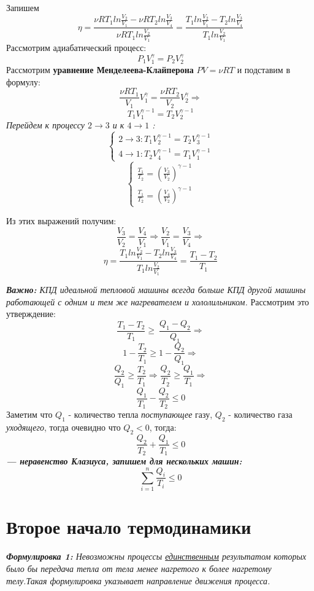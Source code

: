 Запишем
\[ \eta  = \frac{\nu RT_1 ln{\frac{V_2}{V_1}} - \nu RT_2 ln{\frac{V_3}{V_4}}}{\nu RT_1 ln{\frac{V_2}{V_1}}} =  \frac{T_1ln{\frac{V_2}{V_1}} - T_2ln{\frac{V_3}{V_4}}}{T_1ln{\frac{V_2}{V_1}}}\]
Рассмотрим адиабатический процесс:
\[ P_1V_1^{\gamma} = P_2V_2^{\gamma}\]
Рассмотрим \textbf{уравнение Менделеева-Клайперона }$ PV = \nu RT$ и подставим в формулу:
\[ \frac{\nu RT_1}{V_1}V_1^{\gamma} = \frac{\nu RT_2}{V_2}V_2^{\gamma} \Rightarrow \]
\[ T_1V_1^{\gamma - 1} = T_2V_2^{\gamma - 1}\]
\textit{Перейдем к процессу $2 \to 3$  и к $ 4 \to 1$ :}
\begin{equation*}
    \begin{cases}
        2 \to 3: T_1V_2^{\gamma - 1} = T_2V_3^{\gamma - 1}
        \\
        4 \to 1: T_2V_4^{\gamma - 1} = T_1V_1^{\gamma - 1}
    \end{cases}
\end{equation*}
\begin{equation*}
    \begin{cases}
        \frac{T_1}{T_2} = (\frac{V_3}{V_2}) ^ {\gamma - 1}
        \\
        \frac{T_1}{T_2} = (\frac{V_4}{V_2}) ^ {\gamma - 1}
    \end{cases}
\end{equation*}

Из этих выражений получим:
\[ \frac{V_3}{V_2} = \frac{V_4}{V_1} \Rightarrow \frac{V_2}{V_1} = \frac{V_3}{V_4} \Rightarrow\]
\[ \eta = \frac{T_1ln{\frac{V_2}{V_1}} - T_2ln{\frac{V_3}{V_4}}}{T_1ln{\frac{V_2}{V_1}}} = \frac{T_1 - T_2}{T_1}\]

\textit{\textbf{Важно: }КПД идеальной тепловой машины всегда больше КПД другой машины работающей с одним и тем же нагревателем и хололильником.} Рассмотрим это утверждение:
\[ \frac{T_1 - T_2}{T_1} \geq\ \frac{Q_1 - Q_2}{Q_1} \Rightarrow \]
\[1 - \frac{T_2}{T_1} \geq 1 - \frac{Q_2}{Q_1} \Rightarrow \]
\[ \frac{Q_2}{Q_1} \geq \frac{T_2}{T_1} \Rightarrow \frac{Q_2}{T_2} \geq \frac{Q_1}{T_1} \Rightarrow \]
\[\frac{Q_1}{T_1} - \frac{Q_2}{T_2}  \leq 0\]
Заметим что $Q_1$ - количество тепла \textit{поступающее} газу, $Q_2$ - количество газа \textit{уходящего}, тогда очевидно что $Q_2 < 0$, тогда:
\[\frac{Q_2}{T_2} + \frac{Q_1}{T_1} \leq 0\]
\textbf{\textit{ --- неравенство Клазиуса, запишем для нескольких машин:}}
\[ \sum_{i = 1}^{n} \frac{Q_i}{T_i} \leq 0\]

\section{Второе начало термодинамики}
\textit{\textbf{Формулировка 1:} Невозможны процессы \underline{единственным} результатом которых было бы передача тепла от тела менее нагретого к более нагретому телу.Такая формулировка указывает направление движения процесса.}

